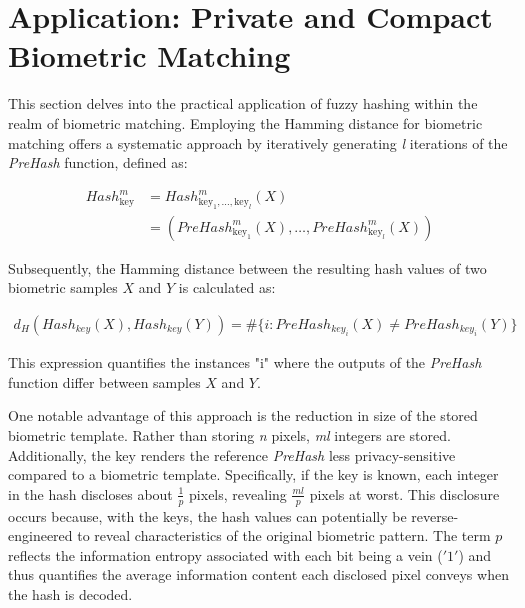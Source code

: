 \newpage
\section{Application: Private and Compact Biometric Matching}
\label{Application: Private and Compact Biometric Matching}

This section delves into the practical application of fuzzy hashing within the realm of biometric matching. Employing the Hamming distance for biometric matching offers a systematic approach by iteratively generating \textit{l} iterations of the \textit{PreHash} function, defined as:

\begin{equation}
    \begin{aligned}
        Hash_{\text{key}}^m &= Hash_{\text{key}_1, \ldots, \text{key}_l}^m(X)\\
        &= (PreHash_{\text{key}_1}^m(X), \ldots, PreHash_{\text{key}_l}^m(X))
    \end{aligned}
\end{equation}

Subsequently, the Hamming distance between the resulting hash values of two biometric samples \(X\) and \(Y\) is calculated as:

\begin{equation}
    \begin{aligned}
        \label{eq:HammingDist}
        d_H(Hash_{key}(X), Hash_{key}(Y)) = \# \{i: PreHash_{key_i}(X) \neq PreHash_{key_i}(Y)\}
    \end{aligned}
\end{equation}

This expression quantifies the instances "i" where the outputs of the \textit{PreHash} function differ between samples \(X\) and \(Y\).

One notable advantage of this approach is the reduction in size of the stored biometric template. Rather than storing \textit{n} pixels, \textit{ml} integers are stored. Additionally, the key renders the reference \textit{PreHash} less privacy-sensitive compared to a biometric template. Specifically, if the key is known, each integer in the hash discloses about \(\frac{1}{p}\) pixels, revealing \(\frac{ml}{p}\) pixels at worst. This disclosure occurs because, with the keys, the hash values can potentially be reverse-engineered to reveal characteristics of the original biometric pattern. The term \(p\)​ reflects the information entropy associated with each bit being a vein (\('1'\)) and thus quantifies the average information content each disclosed pixel conveys when the hash is decoded.

